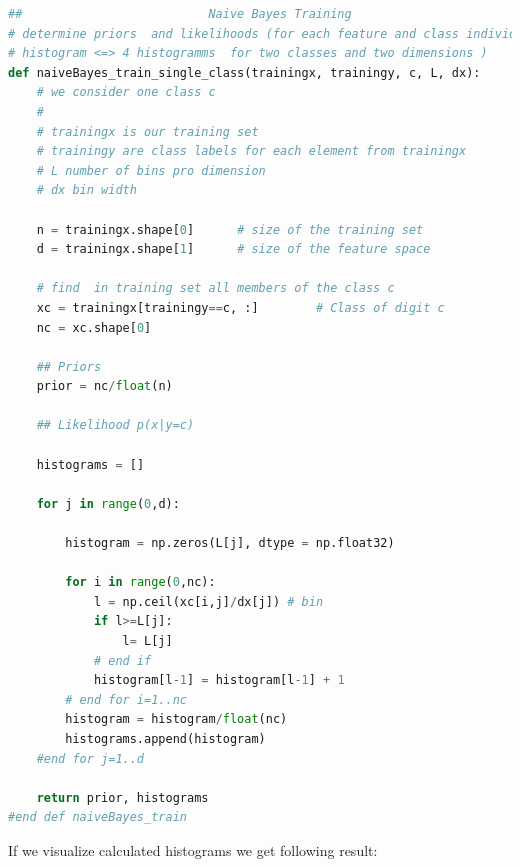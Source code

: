 \documentclass{article}
\begin{document}
\begin{lstlisting}[language=Python]
##                          Naive Bayes Training
# determine priors  and likelihoods (for each feature and class individual 
# histogram <=> 4 histogramms  for two classes and two dimensions ) 
def naiveBayes_train_single_class(trainingx, trainingy, c, L, dx):
    # we consider one class c
    #    
    # trainingx is our training set    
    # trainingy are class labels for each element from trainingx
    # L number of bins pro dimension
    # dx bin width
        
    n = trainingx.shape[0]      # size of the training set
    d = trainingx.shape[1]      # size of the feature space
    
    # find  in training set all members of the class c
    xc = trainingx[trainingy==c, :]        # Class of digit c
    nc = xc.shape[0]

    ## Priors
    prior = nc/float(n)
    
    ## Likelihood p(x|y=c)
    
    histograms = [] 
  
    for j in range(0,d):
        
        histogram = np.zeros(L[j], dtype = np.float32)
        
        for i in range(0,nc):    
            l = np.ceil(xc[i,j]/dx[j]) # bin 
            if l>=L[j]:
                l= L[j]
            # end if
            histogram[l-1] = histogram[l-1] + 1
        # end for i=1..nc
        histogram = histogram/float(nc)    
        histograms.append(histogram)
    #end for j=1..d                 

    return prior, histograms
#end def naiveBayes_train
\end{lstlisting}

If we visualize calculated histograms we get following result:
\end{document}
